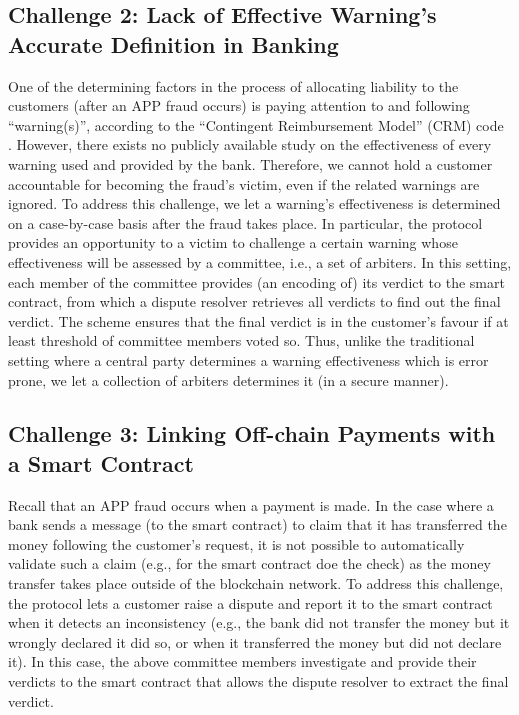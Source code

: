 \subsection{Challenge 2: Lack of Effective Warning's Accurate Definition in Banking}

One of the determining  factors in the process of allocating liability to the customers (after an APP fraud occurs) is paying attention to and following ``warning(s)'', according to the ``Contingent Reimbursement Model'' (CRM) code \cite{CRM-code}. However, there exists  no  publicly available study  on the  effectiveness of every warning used and provided by the bank. Therefore, we cannot hold a customer accountable for becoming the fraud's victim,  even if the related warnings are ignored.    To address this challenge, we let a warning's effectiveness is determined on a case-by-case basis after the fraud takes place. In particular, the protocol provides an opportunity to a victim to  challenge a certain warning whose effectiveness will be assessed by a committee, i.e., a  set of arbiters. In this setting, each member of the  committee provides (an encoding of) its verdict to the smart contract, from which a dispute resolver retrieves all verdicts to find out the final verdict. The scheme ensures that the final verdict is  in the customer's favour if at least threshold of committee members voted so. Thus, unlike the traditional setting where a central party determines a warning effectiveness which is error prone, we let a collection of arbiters   determines it (in a secure manner).







\subsection{Challenge 3: Linking Off-chain Payments with a Smart Contract}\label{sec::Linking Off-chain-Payments-with-contract}
 Recall that an APP fraud occurs when a payment is made. In the case where a  bank  sends a message (to the smart contract) to  claim  that it has transferred the money following the customer's request, it is not possible to automatically validate such a claim (e.g.,  for the smart contract doe the  check) as the money  transfer takes place  outside of the blockchain network. To address this challenge, the protocol lets a customer raise a dispute and report it to the smart contract when it detects an inconsistency (e.g., the bank did not transfer the money but it wrongly declared it did so, or when it transferred the money but did not declare it). In this case, the above committee members investigate and provide their  verdicts to the smart contract that allows the dispute resolver to extract the final verdict. 


